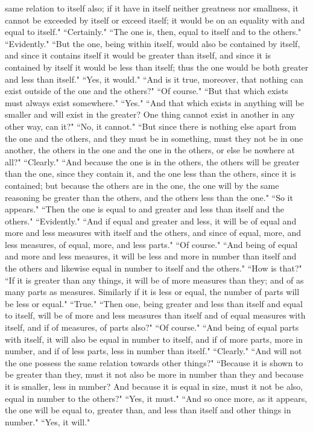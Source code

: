 \documentclass[letterpaper,12pt]{article}
\newcommand{\stephpag}[1]{\marginnote{\small\itshape\fontfamily{ppl}\selectfont #1}}
\begin{document}
same relation to itself also; if it have in itself neither greatness nor smallness, it cannot be exceeded by itself or exceed itself; it would be on an equality with and equal to itself." ``Certainly." ``The one is, then, equal to itself and to the others." ``Evidently." ``But the one, being within itself, would also be contained by itself, and since it contains itself it would be greater than itself, and since it is contained by itself it would be less than itself; \stephpag{151 a} thus the one would be both greater and less than itself." ``Yes, it would." ``And is it true, moreover, that nothing can exist outside of the one and the others?" ``Of course." ``But that which exists must always exist somewhere." ``Yes." ``And that which exists in anything will be smaller and will exist in the greater? One thing cannot exist in another in any other way, can it?" ``No, it cannot." ``But since there is nothing else apart from the one and the others, and they must be in something, must they not be in one another, the others in the one and the one in the others, \stephpag{b} or else be nowhere at all?" ``Clearly." ``And because the one is in the others, the others will be greater than the one, since they contain it, and the one less than the others, since it is contained; but because the others are in the one, the one will by the same reasoning be greater than the others, and the others less than the one." ``So it appears." ``Then the one is equal to and greater and less than itself and the others." ``Evidently." ``And if equal and greater and less, it will be of equal and more and \stephpag{c} less measures with itself and the others, and since of equal, more, and less measures, of equal, more, and less parts." ``Of course." ``And being of equal and more and less measures, it will be less and more in number than itself and the others and likewise equal in number to itself and the others." ``How is that?" ``If it is greater than any things, it will be of more measures than they; and of as many parts as measures. Similarly if it is less or equal, the number of parts will be less or equal." ``True." ``Then one, being greater and less than itself \stephpag{d} and equal to itself, will be of more and less measures than itself and of equal measures with itself, and if of measures, of parts also?" ``Of course." ``And being of equal parts with itself, it will also be equal in number to itself, and if of more parts, more in number, and if of less parts, less in number than itself." ``Clearly." ``And will not the one possess the same relation towards other things?" ``Because it is shown to be greater than they, must it not also be more in number than they and because it is smaller, less in number? And because it is equal in size, must it not be also, equal in number to the others?" ``Yes, it must." \stephpag{e} ``And so once more, as it appears, the one will be equal to, greater than, and less than itself and other things in number." ``Yes, it will."
\end{document}

